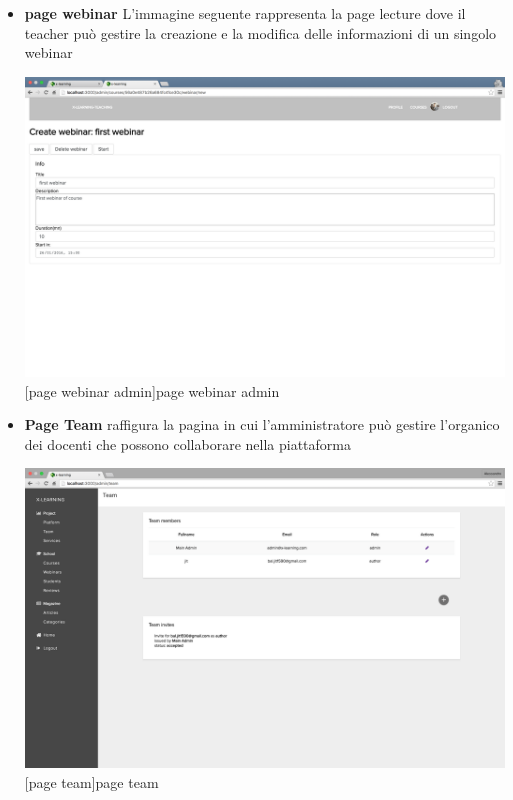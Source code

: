 \begin{itemize}
\item \textbf{page webinar} L'immagine seguente rappresenta la page lecture dove il teacher può gestire la creazione e la modifica delle informazioni di un singolo webinar\par

\begin{minipage}{\linewidth}
    \centering
    \includegraphics[width=1.0\linewidth]{images/chapter4/page-webinar-admin.png}
    [page webinar admin]{page webinar admin}
\end{minipage}

\item \textbf{Page Team} raffigura la pagina in cui l'amministratore può gestire l'organico dei docenti che possono collaborare nella piattaforma\par

\begin{minipage}{\linewidth}
    \centering
    \includegraphics[width=1.0\linewidth]{images/chapter4/page-team-admin.png}
    [page team]{page team}
\end{minipage}


\end{itemize}
